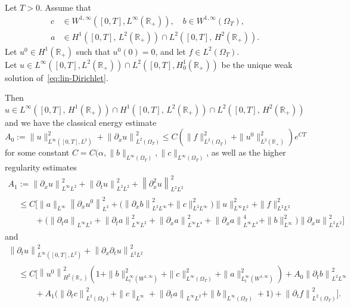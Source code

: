 \documentclass[AHL,Unicode,longabstracts,published]{cedram}
\newcommand{\R}{\mathbb{R}}
\newcommand{\p}{\partial}
\begin{document}
\begin{prop}\label{prop:est-gal}
Let $T>0$.
Assume that
\begin{align*}
c &\in W^{1,\infty}\left([0,T], L^\infty(\R_+)\right), \quad b\in W^{1,\infty}(\Omega_T), \\
a &\in H^1\left([0,T],\,L^2(\R_+)\right) \cap L^2\left([0,T],\, H^2(\R_+)\right).
\end{align*}
Let $u^0\in H^1(\R_+)$ such that $u^0(0)=0$, and let $f\in L^2(\Omega_T)$.\\
Let $u\in L^\infty([0,T], L^2(\R_+))\cap L^2([0,T], H^1_0(\R_+))$ be the unique weak solution of~\eqref{eq:lin-Dirichlet}.


Then $u \in L^\infty([0,T],\,H^1(\R_+)) \cap H^1([0,T],\, L^2(\R_+)) \cap L^2([0,T],\,H^2(\R_+))$ and we have the classical energy estimate
\begin{equation}\label{est:energy-gal-1}
A_0:=\| u\|_{L^\infty\left([0,T], L^2\right)}^2 + \left\| \p_x u\right\|_{L^2(\Omega_T)}^2
\leq C \left(\|f\|_{L^2(\Omega_T)}^2 + \| u^0\|_{L^2(\R_+)}^2\right)e^{CT}
\end{equation}
for some constant $C=C(\alpha, \|b\|_{L^\infty(\Omega_T)}, \|c\|_{L^\infty(\Omega_T)}$, as well as the higher regularity estimates
\begin{multline}\label{est:energy-gal-u_x}
A_1:= \left\|\partial_x u\right\|_{L^\infty L^2}^2 + \left\|\partial_t u\right\|_{L^2 L^2}^2 + \left\|\partial^2_x u\right\|_{L^2 L^2}^2  \\
\begin{aligned}
& \leq C \Bigg[
\|a\|_{L^\infty}\left\|\partial_x u^0\right\|_{L^2}^2 + \big(\left\|\partial_x b\right\|_{L^2 L^\infty}^2 + \|c\|_{L^2L^\infty}^2\big) \|u\|_{L^\infty L^2}^2 + \|f\|_{L^2 L^2}^2\\
& \qquad + \big(\left\|\partial_t a\right\|_{L^\infty L^2}+ \left\|\partial_t a\right\|_{L^\infty L^2}^2 + \left\|\partial_x a\right\|_{L^\infty L^4}^2 + \left\|\partial_x a\right\|_{L^\infty L^4}^4 + \|b\|_{L^\infty}^2 \big) \left\|\partial_x u\right\|_{L^2 L^2}^2
\Bigg]
\end{aligned}
\end{multline}
and
\begin{multline}\label{est:energy-gal-u_xx}
 \left\|\p_t u\right\|_{L^\infty\left([0,T], L^2\right)}^2 + \left\| \p_x\p_t u\right\|_{L^2L^2}^2 \\
\begin{aligned}
&\leq C\Big[\left\|u^0\right\|_{H^2(\R_+)}^2 \left(1 + \| b\|_{L^\infty_t\left(W^{1,\infty}\right)}^2 + \|c\|_{L^\infty(\Omega_T)}^2 + \| a\|_{L^\infty_t\left(W^{1,\infty}\right)}^2\right)+ A_0\left\|\partial_t b\right\|_{L^2 L^\infty}^2\\
&\qquad+ A_1\big(\left\|\partial_t c\right\|_{L^2(\Omega_T)}^2+ \|c\|_{L^\infty} + \left\|\partial_t a\right\|_{L^\infty L^2} + \|b\|_{L^\infty(\Omega_T)} +1\big) + \left\|\partial_t f\right\|_{L^2(\Omega_T)}^2 \Big].
\end{aligned}
\end{multline}
\end{prop}
\end{document}
